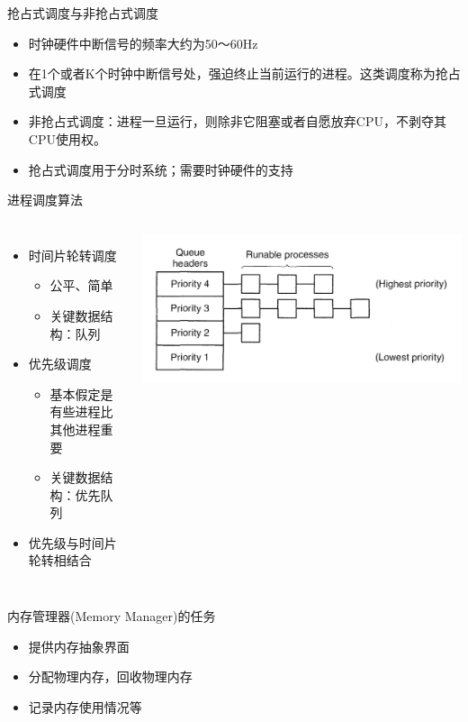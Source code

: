 \documentclass[xcolor=svgnames]{beamer}
\begin{document}
\begin{CJK*}{UTF8}{gbsn}
\begin{frame}{抢占式调度与非抢占式调度}
\begin{itemize}
\item 时钟硬件中断信号的频率大约为50～60Hz
\item 在1个或者K个时钟中断信号处，强迫终止当前运行的进程。这类调度称为抢占式调度
\item 非抢占式调度：进程一旦运行，则除非它阻塞或者自愿放弃CPU，不剥夺其CPU使用权。
\item 抢占式调度用于分时系统；需要\alert{时钟硬件}的支持
\end{itemize}
\end{frame}

\begin{frame}{进程调度算法}
\begin{columns}
\begin{itemize}
\item 时间片轮转调度
\begin{itemize}
\item 公平、简单
\item 关键数据结构：队列
\end{itemize}
\item 优先级调度
\begin{itemize}
\item 基本假定是有些进程比其他进程重要
\item 关键数据结构：\alert{优先队列}
\end{itemize}
\item 优先级与时间片轮转相结合
\end{itemize}
\includegraphics[width=1.0\textwidth]{comb.png}
\end{columns}
\end{frame}

\begin{frame}{内存管理器(Memory Manager)的任务}
\begin{itemize}
\item 提供内存抽象界面
\item 分配物理内存，回收物理内存
\item 记录内存使用情况等
\end{itemize}
\end{frame}


\end{CJK*}
\end{document}
